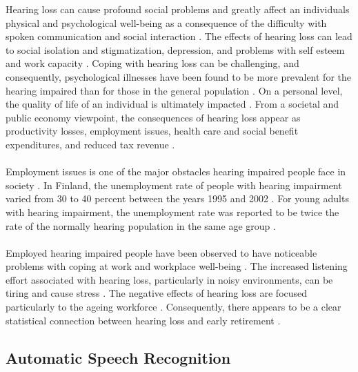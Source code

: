 \documentclass[english, 12pt, a4paper, pdftex, elec, utf8]{aaltothesis}
\begin{document}
Hearing loss can cause profound social problems and greatly affect an individuals physical and psychological well-being as a consequence of the difficulty with spoken communication and social interaction \cite{wilson2017global, koskela2013kuulokojeen}. The effects of hearing loss can lead to social isolation and stigmatization, depression, and problems with self esteem and work capacity \cite{wilson2017global, koskela2013kuulokojeen, lavikainen2014}. Coping with hearing loss can be challenging, and consequently, psychological illnesses have been found to be more prevalent for the hearing impaired than for those in the general population \cite{wilson2017global}. On a personal level, the quality of life of an individual is ultimately impacted \cite{blomberg2012sisakorvaistutetta}. From a societal and public economy viewpoint, the consequences of hearing loss appear as productivity losses, employment issues, health care and social benefit expenditures, and reduced tax revenue  \cite{wilson2017global}. \\\\
Employment issues is one of the major obstacles hearing impaired people face in society \cite{hietala2008huonokuuloinen}. In Finland, the unemployment rate of people with hearing impairment varied from 30 to 40 percent between the years 1995 and 2002 \cite{hietala2008huonokuuloinen}. For young adults with hearing impairment, the unemployment rate was reported to be twice the rate of the normally hearing population in the same age group \cite{hietala2008huonokuuloinen}. \\\\
Employed hearing impaired people have been observed to have noticeable problems with coping at work and workplace well-being \cite{wilson2017global, hietala2008huonokuuloinen}. The increased listening effort associated with hearing loss, particularly in noisy environments, can be tiring and cause stress \cite{ohlenforst2017effects, koskela2013kuulokojeen}. The negative effects of hearing loss are focused particularly to the ageing workforce \cite{koskela2013kuulokojeen}. Consequently, there appears to be a clear statistical connection between hearing loss and early retirement \cite{hietala2008huonokuuloinen}.

\clearpage

\subsection{Automatic Speech Recognition} \label{subsec:asr}
\end{document}
